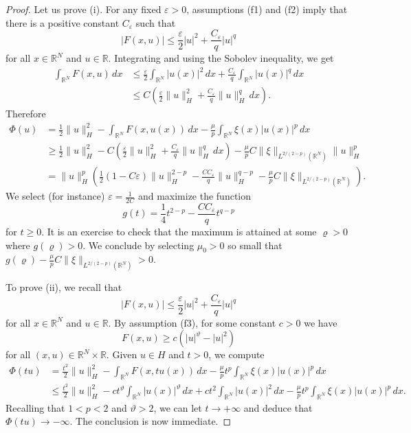 \documentclass[11pt]{amsart}
\numberwithin{equation}{section}
\theoremstyle{remark}
\theoremstyle{definition}
\begin{document}
\begin{proof}
Let us prove (i). For any fixed $\varepsilon>0$, assumptions (f1) and (f2) imply that there is a positive constant $C_\varepsilon$ such that
\begin{equation*}
|F(x,u)| \leq \frac{\varepsilon}{2} |u|^2 + \frac{C_\varepsilon}{q}|u|^q
\end{equation*}
for all $x \in \mathbb{R}^N$ and $u \in \mathbb{R}$. Integrating and using the Sobolev inequality, we get
\begin{align*}
\int_{\mathbb{R}^N} F(x,u)\, dx &\leqslant \frac{\varepsilon}{2} \int_{\mathbb{R}^N} |u(x)|^2 \, dx + \frac{C_\varepsilon}{q} \int_{\mathbb{R}^N} |u(x)|^q \, dx \\
&\leqslant C \left(
\frac{\varepsilon}{2} \|u\|_H^2 + \frac{C_\varepsilon}{q} \|u\|_H^q \, dx
\right).
\end{align*}
Therefore
\begin{align*}
\Phi(u) &= \frac{1}{2} \|u\|_H^2 - \int_{\mathbb{R}^N} F(x,u(x))\, dx - \frac{\mu}{p} \int_{\mathbb{R}^N} \xi(x)|u(x)|^p \, dx \\
&\geqslant \frac{1}{2} \|u\|_H^2 -C \left(
\frac{\varepsilon}{2} \|u\|_H^2 + \frac{C_\varepsilon}{q} \|u\|_H^q \, dx
\right) - \frac{\mu}{p} C\|\xi\|_{L^{2/(2-p)}(\mathbb{R}^N)} \|u\|_H^p \\
&= \|u\|_H^p \left(
\frac{1}{2} \left( 1- C \varepsilon \right) \|u\|_H^{2-p} - \frac{C C_\varepsilon}{q} \|u\|_H^{q-p} - \frac{\mu}{p} C\|\xi\|_{L^{2/(2-p)}(\mathbb{R}^N)} 
\right).
\end{align*}
We select (for instance) $\varepsilon = \frac{1}{2C}$ and maximize the function
\[
g(t) = \frac{1}{4} t^{2-p} - \frac{C C_\varepsilon}{q}t^{q-p}
\]
for $t \geqslant 0$. It is an exercise to check that the maximum is attained at some $\varrho>0$ where $g(\varrho)>0$. We conclude by selecting $\mu_0>0$ so small that $g(\varrho) - \frac{\mu}{p} C\|\xi\|_{L^{2/(2-p)}(\mathbb{R}^N)} >0$.

To prove (ii), we recall that 
\begin{equation*}
|F(x,u)| \leqslant \frac{\varepsilon}{2} |u|^2 + \frac{C_\varepsilon}{q}|u|^q
\end{equation*}
for all $x \in \mathbb{R}^N$ and $u \in \mathbb{R}$. By assumption (f3), for some constant $c>0$ we have
\[
F(x,u) \geqslant c \left( |u|^\vartheta - |u|^2 \right)
\]
for all $(x,u) \in \mathbb{R}^N \times \mathbb{R}$. Given $u \in H$ and $t>0$, we compute
\begin{align*}
\Phi(tu) &= \frac{t^2}{2} \|u\|_H^2 - \int_{\mathbb{R}^N} F(x,tu(x))\, dx - \frac{\mu}{p} t^p \int_{\mathbb{R}^N} \xi(x)|u(x)|^p \, dx \\
&\leqslant  \frac{t^2}{2} \|u\|_H^2  - c t^\vartheta \int_{\mathbb{R}^N} |u(x)|^\vartheta \, dx + ct^2 \int_{\mathbb{R}^N} |u(x)|^2 \, dx - \frac{\mu}{p} t^p \int_{\mathbb{R}^N} \xi(x)|u(x)|^p \, dx.
\end{align*}
Recalling that $1<p<2$ and $\vartheta>2$, we can let $t \to +\infty$ and deduce that $\Phi(tu) \to -\infty$. The conclusion is now immediate.
\end{proof}
\end{document}
